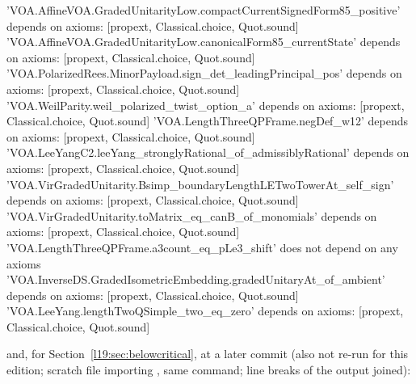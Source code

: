 \begin{plaincode}
'VOA.AffineVOA.GradedUnitarityLow.compactCurrentSignedForm85_positive' depends on axioms: [propext, Classical.choice, Quot.sound]
'VOA.AffineVOA.GradedUnitarityLow.canonicalForm85_currentState' depends on axioms: [propext, Classical.choice, Quot.sound]
'VOA.PolarizedRees.MinorPayload.sign_det_leadingPrincipal_pos' depends on axioms: [propext, Classical.choice, Quot.sound]
'VOA.WeilParity.weil_polarized_twist_option_a' depends on axioms: [propext, Classical.choice, Quot.sound]
'VOA.LengthThreeQPFrame.negDef_w12' depends on axioms: [propext, Classical.choice, Quot.sound]
'VOA.LeeYangC2.leeYang_stronglyRational_of_admissiblyRational' depends on axioms: [propext, Classical.choice, Quot.sound]
'VOA.VirGradedUnitarity.Bsimp_boundaryLengthLETwoTowerAt_self_sign' depends on axioms: [propext, Classical.choice, Quot.sound]
'VOA.VirGradedUnitarity.toMatrix_eq_canB_of_monomials' depends on axioms: [propext, Classical.choice, Quot.sound]
'VOA.LengthThreeQPFrame.a3count_eq_pLe3_shift' does not depend on any axioms
'VOA.InverseDS.GradedIsometricEmbedding.gradedUnitaryAt_of_ambient' depends on axioms: [propext, Classical.choice, Quot.sound]
'VOA.LeeYang.lengthTwoQSimple_two_eq_zero' depends on axioms: [propext, Classical.choice, Quot.sound]
\end{plaincode}

\noindent and, for Section~\ref{l19:sec:belowcritical}, at a later commit (also not re-run for this edition; scratch file importing
, same command; line breaks of the
output joined):

